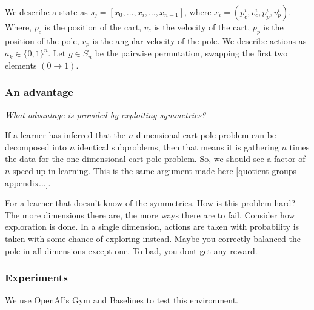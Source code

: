 We describe a state as $s_j = [x_0, \dots, x_i, \dots, x_{n-1}]$, where $x_i = (p_c^i, v_c^i, p_p^i, v_p^i)$. Where, $p_c$ is the position of the cart, $v_c$ is the velocity of the cart, $p_p$ is the position of the pole, $v_p$ is the angular velocity of the pole. We describe actions as $a_k \in \{0, 1\}^n$. Let $g\in S_n$ be the pairwise permutation, swapping the first two elements $(0\to 1)$.



\subsubsection{An advantage}

\begin{displayquote}
\textit{What advantage is provided by exploiting symmetries?}
\end{displayquote}

If a learner has inferred that the $n$-dimensional cart pole problem can be decomposed into $n$ identical subproblems,
then that means it is gathering $n$ times the data for the one-dimensional cart pole problem.
So, we should see a factor of $n$ speed up in learning.
This is the same argument made here [quotient groups appendix...].

For a learner that doesn't know of the symmetries. How is this problem hard?
The more dimensions there are, the more ways there are to fail.
Consider how exploration is done. In a single dimension, actions are taken with probability  is
taken with some chance of exploring instead.
Maybe you correctly balanced the pole in all dimensions except one. To bad, you dont get any reward.

\subsubsection{Experiments}

We use OpenAI's Gym \cite{Brockman2016} and Baselines \cite{baselines} to test this environment.


